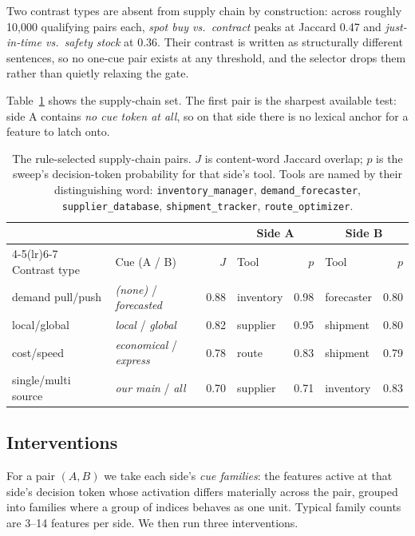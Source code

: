 \documentclass{article}
\begin{document}
Two contrast types are absent from supply chain by construction: across roughly 10{,}000 qualifying pairs each, \emph{spot buy vs.\ contract} peaks at Jaccard 0.47 and \emph{just-in-time vs.\ safety stock} at 0.36. Their contrast is written as structurally different sentences, so no one-cue pair exists at any threshold, and the selector drops them rather than quietly relaxing the gate.

Table~\ref{tab:pairs} shows the supply-chain set. The first pair is the sharpest available test: side A contains \emph{no cue token at all}, so on that side there is no lexical anchor for a feature to latch onto.

\begin{table}[t]
\caption{The rule-selected supply-chain pairs. $J$ is content-word Jaccard overlap; $p$ is the sweep's decision-token probability for that side's tool. Tools are named by their distinguishing word: \texttt{inventory\_manager}, \texttt{demand\_forecaster}, \texttt{supplier\_database}, \texttt{shipment\_tracker}, \texttt{route\_optimizer}.}
\label{tab:pairs}
\centering
\footnotesize
\setlength{\tabcolsep}{4pt}
\begin{tabular}{@{}llrlrlr@{}}
\toprule
& & & \multicolumn{2}{c}{Side A} & \multicolumn{2}{c}{Side B} \\
\cmidrule(lr){4-5}\cmidrule(lr){6-7}
Contrast type & Cue (A / B) & $J$ & Tool & $p$ & Tool & $p$ \\
\midrule
demand pull/push & \emph{(none)} / \emph{forecasted} & 0.88 & inventory & 0.98 & forecaster & 0.80 \\
local/global & \emph{local} / \emph{global} & 0.82 & supplier & 0.95 & shipment & 0.80 \\
cost/speed & \emph{economical} / \emph{express} & 0.78 & route & 0.83 & shipment & 0.79 \\
single/multi source & \emph{our main} / \emph{all} & 0.70 & supplier & 0.71 & inventory & 0.83 \\
\bottomrule
\end{tabular}
\end{table}

\subsection{Interventions}

For a pair $(A, B)$ we take each side's \emph{cue families}: the features active at that side's decision token whose activation differs materially across the pair, grouped into families where a group of indices behaves as one unit. Typical family counts are 3--14 features per side. We then run three interventions.
\end{document}
